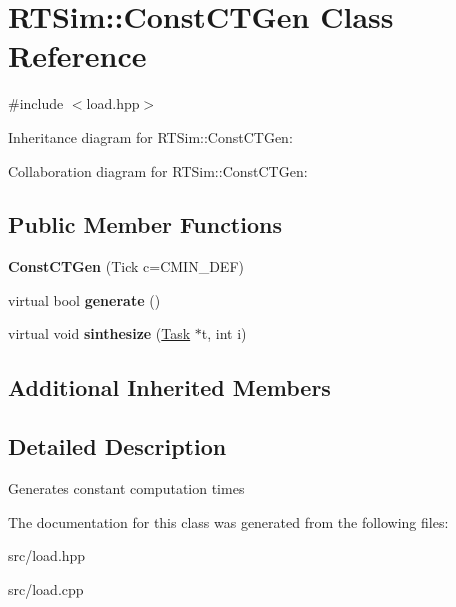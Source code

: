 \hypertarget{classRTSim_1_1ConstCTGen}{}\section{R\+T\+Sim\+:\+:Const\+C\+T\+Gen Class Reference}
\label{classRTSim_1_1ConstCTGen}


{\ttfamily \#include $<$load.\+hpp$>$}



Inheritance diagram for R\+T\+Sim\+:\+:Const\+C\+T\+Gen\+:


Collaboration diagram for R\+T\+Sim\+:\+:Const\+C\+T\+Gen\+:
\subsection*{Public Member Functions}
\begin{DoxyCompactItemize}
\item 
{\bfseries Const\+C\+T\+Gen} (Tick c=C\+M\+I\+N\+\_\+\+D\+EF)\hypertarget{classRTSim_1_1ConstCTGen_abe584a7e41f8bef823af8a72acb34e4b}{}\label{classRTSim_1_1ConstCTGen_abe584a7e41f8bef823af8a72acb34e4b}

\item 
virtual bool {\bfseries generate} ()\hypertarget{classRTSim_1_1ConstCTGen_aa3b7b08b56f80aa94c6ba43e15d4e2f6}{}\label{classRTSim_1_1ConstCTGen_aa3b7b08b56f80aa94c6ba43e15d4e2f6}

\item 
virtual void {\bfseries sinthesize} (\hyperlink{classRTSim_1_1Task}{Task} $\ast$t, int i)\hypertarget{classRTSim_1_1ConstCTGen_a3a59ce6e9a1a8f1297fbcd727f1a31ae}{}\label{classRTSim_1_1ConstCTGen_a3a59ce6e9a1a8f1297fbcd727f1a31ae}

\end{DoxyCompactItemize}
\subsection*{Additional Inherited Members}


\subsection{Detailed Description}
Generates constant computation times 

The documentation for this class was generated from the following files\+:\begin{DoxyCompactItemize}
\item 
src/load.\+hpp\item 
src/load.\+cpp\end{DoxyCompactItemize}
